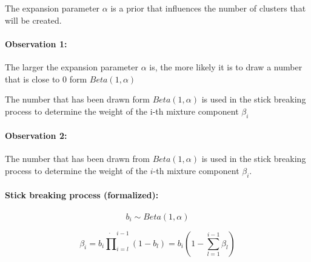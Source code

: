 The expansion parameter $\alpha$ is a prior that influences the number of clusters that will be created.

\paragraph{Observation 1:}
The larger the expansion parameter $\alpha$ is, the more likely it is to draw a number that is close to $0$ form $Beta(1,\alpha)$

The number that has been drawn form $Beta(1,\alpha)$ is used in the stick breaking process to determine the weight of the i-th mixture component $\beta_i$

\paragraph{Observation 2:}
The number that has been drawn from \(Beta(1,\alpha)\) is used in the stick breaking process to determine the weight of the \(i\)-th mixture component \(\beta_i\).

\paragraph{Stick breaking process (formalized):}

\begin{equation*}
	b_i \sim Beta(1,\alpha)
\end{equation*}

\begin{equation*}
	\beta_i = b_i \dot \prod_{i=l}^{i-1}(1-b_l) = b_i (1 - \sum_{l=1}^{i-1} \beta_l)
\end{equation*}

